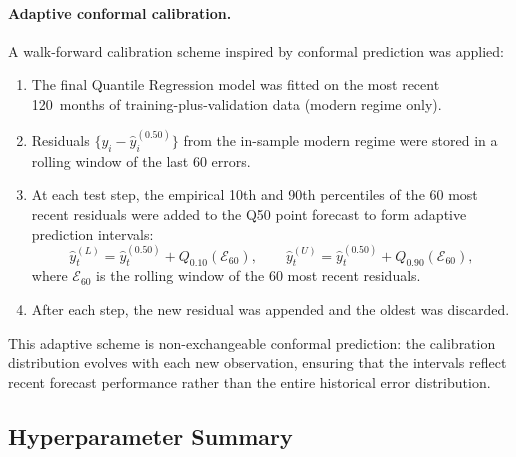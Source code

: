 \documentclass[12pt,a4paper]{article}
\begin{document}
\paragraph{Adaptive conformal calibration.}
A walk-forward calibration scheme inspired by conformal prediction \citep{vovk2005} was applied:
\begin{enumerate}
  \item The final Quantile Regression model was fitted on the most recent 120~months of training-plus-validation data (modern regime only).
  \item Residuals $\{y_i - \hat{y}_i^{(0.50)}\}$ from the in-sample modern regime were stored in a rolling window of the last 60 errors.
  \item At each test step, the empirical 10th and 90th percentiles of the 60 most recent residuals were added to the Q50 point forecast to form adaptive prediction intervals:
  \begin{equation}
    \hat{y}_t^{(L)} = \hat{y}_t^{(0.50)} + Q_{0.10}(\mathcal{E}_{60}), \qquad
    \hat{y}_t^{(U)} = \hat{y}_t^{(0.50)} + Q_{0.90}(\mathcal{E}_{60}),
    \label{eq:conformal}
  \end{equation}
  where $\mathcal{E}_{60}$ is the rolling window of the 60 most recent residuals.
  \item After each step, the new residual was appended and the oldest was discarded.
\end{enumerate}
This adaptive scheme is non-exchangeable conformal prediction: the calibration distribution evolves with each new observation, ensuring that the intervals reflect recent forecast performance rather than the entire historical error distribution.

\subsection{Hyperparameter Summary}
\end{document}
